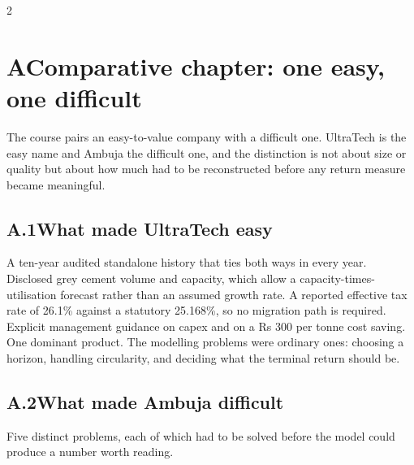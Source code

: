 




\begin{paracol}{2}
\section*{A\quad Comparative chapter: one easy, one difficult}
\addtocounter{section}{0}

The course pairs an easy-to-value company with a difficult one. UltraTech is the easy
name and Ambuja the difficult one, and the distinction is not about size or quality
but about how much had to be reconstructed before any return measure became
meaningful.

\subsection*{A.1\quad What made UltraTech easy}

A ten-year audited standalone history that ties both ways in every year. Disclosed
grey cement volume and capacity, which allow a capacity-times-utilisation forecast
rather than an assumed growth rate. A reported effective tax rate of 26.1\% against a
statutory 25.168\%, so no migration path is required. Explicit management guidance on
capex and on a Rs 300 per tonne cost saving. One dominant product. The modelling
problems were ordinary ones: choosing a horizon, handling circularity, and deciding
what the terminal return should be.

\subsection*{A.2\quad What made Ambuja difficult}

Five distinct problems, each of which had to be solved before the model could produce
a number worth reading.


\end{paracol}
